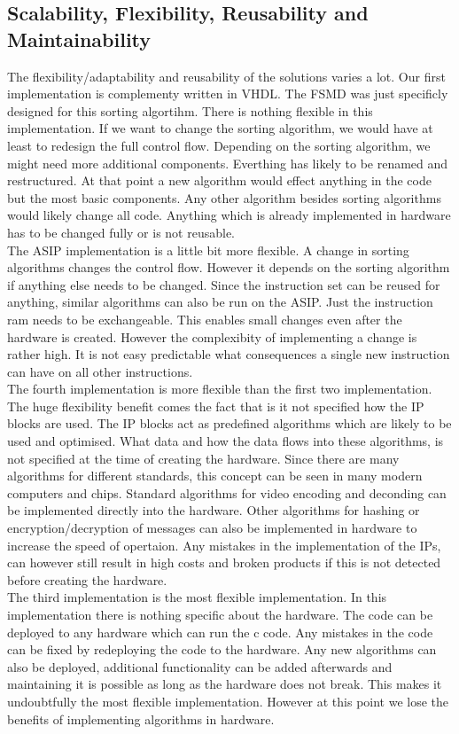 \documentclass[conference]{IEEEtran}
\begin{document}
\subsection{Scalability, Flexibility, Reusability and Maintainability}
The flexibility/adaptability and reusability of the solutions varies a lot. Our first implementation is complementy written in VHDL. The FSMD was just specificly designed for this sorting algortihm. There is nothing flexible in this implementation. If we want to change the sorting algorithm, we would have at least to redesign the full control flow. Depending on the sorting algorithm, we might need more additional components. Everthing has likely to be renamed and restructured. At that point a new algorithm would effect anything in the code but the most basic components. Any other algorithm besides sorting algorithms would likely change all code. Anything which is already implemented in hardware has to be changed fully or is not reusable. \\
The ASIP implementation is a little bit more flexible. A change in sorting algorithms changes the control flow. However it depends on the sorting algorithm if anything else needs to be changed. Since the instruction set can be reused for anything, similar algorithms can also be run on the ASIP. Just the instruction ram needs to be exchangeable. This enables small changes even after the hardware is created. However the complexibity of implementing a change is rather high. It is not easy predictable what consequences a single new instruction can have on all other instructions. \\
The fourth implementation is more flexible than the first two implementation. The huge flexibility benefit comes the fact that is it not specified how the IP blocks are used. The IP blocks act as predefined algorithms which are likely to be used and optimised. What data and how the data flows into these algorithms, is not specified at the time of creating the hardware. Since there are many algorithms for different standards, this concept can be seen in many modern computers and chips. Standard algorithms for video encoding and deconding can be implemented directly into the hardware. Other algorithms for hashing or encryption/decryption of messages can also be implemented in hardware to increase the speed of opertaion. Any mistakes in the implementation of the IPs, can however still result in high costs and broken products if this is not detected before creating the hardware. \\
The third implementation is the most flexible implementation. In this implementation there is nothing specific about the hardware. The code can be deployed to any hardware which can run the c code. Any mistakes in the code can be fixed by redeploying the code to the hardware. Any new algorithms can also be deployed, additional functionality can be added afterwards and maintaining it is possible as long as the hardware does not break. This makes it undoubtfully the most flexible implementation. However at this point we lose the benefits of implementing algorithms in hardware. \\
\end{document}
